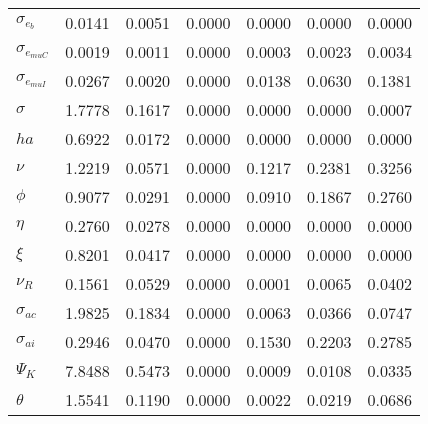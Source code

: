 \begin{center}
\begin{longtable}{lcccccc}
$ \sigma_{{e_b}}       $	 & 	          0.0141	 & 	          0.0051	 & 	          0.0000	 & 	          0.0000	 & 	          0.0000	 & 	          0.0000 \\ 
$ \sigma_{{e_{muC}}}   $	 & 	          0.0019	 & 	          0.0011	 & 	          0.0000	 & 	          0.0003	 & 	          0.0023	 & 	          0.0034 \\ 
$ \sigma_{{e_{muI}}}   $	 & 	          0.0267	 & 	          0.0020	 & 	          0.0000	 & 	          0.0138	 & 	          0.0630	 & 	          0.1381 \\ 
$ {\sigma}             $	 & 	          1.7778	 & 	          0.1617	 & 	          0.0000	 & 	          0.0000	 & 	          0.0000	 & 	          0.0007 \\ 
$ {ha}                 $	 & 	          0.6922	 & 	          0.0172	 & 	          0.0000	 & 	          0.0000	 & 	          0.0000	 & 	          0.0000 \\ 
$ \nu                  $	 & 	          1.2219	 & 	          0.0571	 & 	          0.0000	 & 	          0.1217	 & 	          0.2381	 & 	          0.3256 \\ 
$ {\phi}               $	 & 	          0.9077	 & 	          0.0291	 & 	          0.0000	 & 	          0.0910	 & 	          0.1867	 & 	          0.2760 \\ 
$ {\eta}               $	 & 	          0.2760	 & 	          0.0278	 & 	          0.0000	 & 	          0.0000	 & 	          0.0000	 & 	          0.0000 \\ 
$ \xi                  $	 & 	          0.8201	 & 	          0.0417	 & 	          0.0000	 & 	          0.0000	 & 	          0.0000	 & 	          0.0000 \\ 
$ {\nu_R}              $	 & 	          0.1561	 & 	          0.0529	 & 	          0.0000	 & 	          0.0001	 & 	          0.0065	 & 	          0.0402 \\ 
$ {\sigma_{ac}}        $	 & 	          1.9825	 & 	          0.1834	 & 	          0.0000	 & 	          0.0063	 & 	          0.0366	 & 	          0.0747 \\ 
$ {\sigma_{ai}}        $	 & 	          0.2946	 & 	          0.0470	 & 	          0.0000	 & 	          0.1530	 & 	          0.2203	 & 	          0.2785 \\ 
$ {\Psi_{K}}           $	 & 	          7.8488	 & 	          0.5473	 & 	          0.0000	 & 	          0.0009	 & 	          0.0108	 & 	          0.0335 \\ 
$ {\theta}             $	 & 	          1.5541	 & 	          0.1190	 & 	          0.0000	 & 	          0.0022	 & 	          0.0219	 & 	          0.0686 \\ 

\end{longtable}
\end{center}

